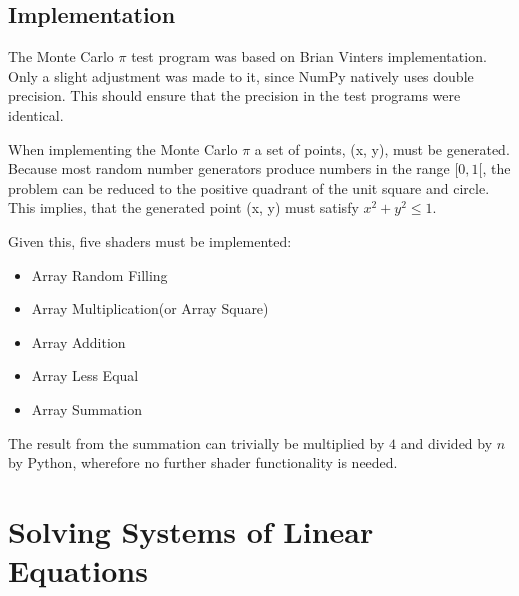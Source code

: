 \subsection{Implementation}

The Monte Carlo $\pi$ test program was based on Brian Vinters
implementation. Only a slight adjustment was made to it, since NumPy
natively uses double precision. This should ensure that the precision
in the test programs were identical.




When implementing the Monte Carlo $\pi$ a set of points, (x, y), must
be generated. Because most random number generators produce numbers in
the range $[0, 1[$, the problem can be reduced to the positive
    quadrant of the unit square and circle. This implies, that
    the generated point (x, y) must satisfy $x^2 + y^2 \le 1$.

Given this, five shaders must be implemented:

\begin{itemize}
\item{Array Random Filling}
\item{Array Multiplication(or Array Square)}
\item{Array Addition}
\item{Array Less Equal}
\item{Array Summation}
\end{itemize}

The result from the summation can trivially be multiplied by $4$ and
divided by $n$ by Python, wherefore no further shader functionality is
needed.


%


\section{Solving Systems of Linear Equations}

